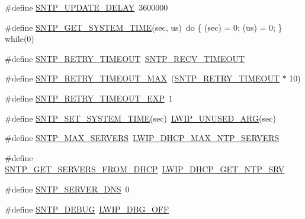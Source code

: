 \begin{DoxyCompactItemize}
\item 
\#define \hyperlink{group__sntp__opts_ga9232c56443115be05a2f852eba21979c}{S\+N\+T\+P\+\_\+\+U\+P\+D\+A\+T\+E\+\_\+\+D\+E\+L\+AY}~3600000
\item 
\#define \hyperlink{group__sntp__opts_gab0ea385479a5c5c8c173f165ded2fb63}{S\+N\+T\+P\+\_\+\+G\+E\+T\+\_\+\+S\+Y\+S\+T\+E\+M\+\_\+\+T\+I\+ME}(sec,  us)~do \{ (sec) = 0; (us) = 0; \} while(0)
\item 
\#define \hyperlink{group__sntp__opts_ga86d651d8eb07687208308deef95a23ba}{S\+N\+T\+P\+\_\+\+R\+E\+T\+R\+Y\+\_\+\+T\+I\+M\+E\+O\+UT}~\hyperlink{group__sntp__opts_ga44cf26b9b19832d88599244711a12d08}{S\+N\+T\+P\+\_\+\+R\+E\+C\+V\+\_\+\+T\+I\+M\+E\+O\+UT}
\item 
\#define \hyperlink{group__sntp__opts_gafde10b3ed7cb4bb2cd2c4daa389db699}{S\+N\+T\+P\+\_\+\+R\+E\+T\+R\+Y\+\_\+\+T\+I\+M\+E\+O\+U\+T\+\_\+\+M\+AX}~(\hyperlink{group__sntp__opts_ga86d651d8eb07687208308deef95a23ba}{S\+N\+T\+P\+\_\+\+R\+E\+T\+R\+Y\+\_\+\+T\+I\+M\+E\+O\+UT} $\ast$ 10)
\item 
\#define \hyperlink{group__sntp__opts_gafdb7e98f608cc429188d7dac356614c2}{S\+N\+T\+P\+\_\+\+R\+E\+T\+R\+Y\+\_\+\+T\+I\+M\+E\+O\+U\+T\+\_\+\+E\+XP}~1
\item 
\#define \hyperlink{group__sntp__opts_gafe340b98c52dedcbc041267fe13b2da6}{S\+N\+T\+P\+\_\+\+S\+E\+T\+\_\+\+S\+Y\+S\+T\+E\+M\+\_\+\+T\+I\+ME}(sec)~\hyperlink{group__compiler__abstraction_ga70624a5deb8b9199406372a7f3603ecf}{L\+W\+I\+P\+\_\+\+U\+N\+U\+S\+E\+D\+\_\+\+A\+RG}(sec)
\item 
\#define \hyperlink{group__sntp__opts_ga5d9dc0827f402849f5c18d44e311dbc2}{S\+N\+T\+P\+\_\+\+M\+A\+X\+\_\+\+S\+E\+R\+V\+E\+RS}~\hyperlink{group__lwip__opts__dhcp_ga9d014e3f7dc9e1e7c7decd8652ba65e2}{L\+W\+I\+P\+\_\+\+D\+H\+C\+P\+\_\+\+M\+A\+X\+\_\+\+N\+T\+P\+\_\+\+S\+E\+R\+V\+E\+RS}
\item 
\#define \hyperlink{group__sntp__opts_ga961a61eef942ab5378cff1e3742b3ade}{S\+N\+T\+P\+\_\+\+G\+E\+T\+\_\+\+S\+E\+R\+V\+E\+R\+S\+\_\+\+F\+R\+O\+M\+\_\+\+D\+H\+CP}~\hyperlink{group__lwip__opts__dhcp_ga2cc18315edcd5ffc083d1256f7d22a83}{L\+W\+I\+P\+\_\+\+D\+H\+C\+P\+\_\+\+G\+E\+T\+\_\+\+N\+T\+P\+\_\+\+S\+RV}
\item 
\#define \hyperlink{group__sntp__opts_gaef477c145ae404d77188b26b79b6996f}{S\+N\+T\+P\+\_\+\+S\+E\+R\+V\+E\+R\+\_\+\+D\+NS}~0
\item 
\#define \hyperlink{group__sntp__opts_ga25c6f9c14c17e218d110d826b09f8d91}{S\+N\+T\+P\+\_\+\+D\+E\+B\+UG}~\hyperlink{group__debugging__levels_gadab1cdc3f45939a3a5c9a3d7e04987e1}{L\+W\+I\+P\+\_\+\+D\+B\+G\+\_\+\+O\+FF}

\end{DoxyCompactItemize}
